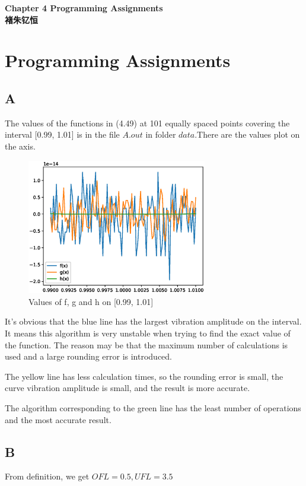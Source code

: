 \documentclass[12]{article}%
\begin{document}
\begin{center}
    \LARGE\songti\textbf{Chapter 4 Programming Assignments} \\%
    \large\kaishu\textbf{褚朱钇恒}%
\end{center}
    \section{Programming Assignments}
        \subsection{A}
            The values of the functions in (4.49) at 101 equally spaced points covering the interval [0.99, 1.01] is in the file $A.out$ in folder $data$.There are the values plot on the axis.
        \begin{figure}[H]
            \centering
            \includegraphics[width=0.7\textwidth]{./pic/A.eps}
            \caption{Values of f, g and h on [0.99, 1.01]}
        \end{figure}

        It's obvious that the blue line has the largest vibration amplitude on the interval. It means this algorithm is very unstable when trying to find the exact value of the function. The reason may be that the maximum number of calculations is used and a large rounding error is introduced.

        The yellow line has less calculation times, so the rounding error is small, the curve vibration amplitude is small, and the result is more accurate.

        The algorithm corresponding to the green line has the least number of operations and the most accurate result.
        \subsection{B}
            From definition, we get $OFL=0.5,UFL=3.5$
\end{document}
